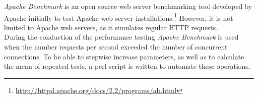 \emph{Apache Benchmark} is an open source web server benchmarking tool developed by Apache initially to test Apache web server installations.\footnote{\url{http://httpd.apache.org/docs/2.2/programs/ab.html}} However, it is not limited to Apache web servers, as it simulates regular HTTP requests.\\
During the conduction of the performance testing \emph{Apache Benchmark} is used when the number requests per second exceeded the number of concurrent connections. To be able to stepwise increase parameters, as well as to calculate the mean of repeated tests, a perl script is written to automate these operations. 
